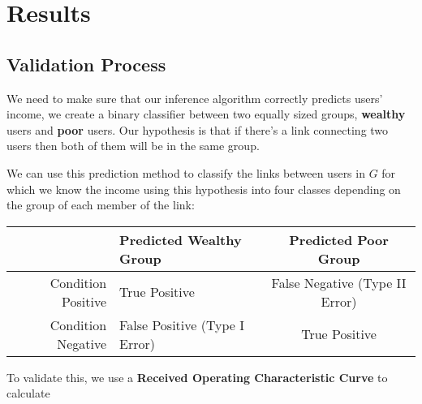 \section{Results}

\subsection{Validation Process}

We need to make sure that our inference algorithm correctly predicts users' income, we create a binary classifier between two equally sized groups, \textbf{wealthy} users and \textbf{poor} users. Our hypothesis is that if there's a link connecting two users then both of them will be in the same group.

We can use this prediction method to classify the links between users in $ G $ for which we know the income using this hypothesis into four classes depending on the group of each member of the link:

\begin{tabularx}{\textwidth}{|r|X|c|} \hline
& Predicted Wealthy Group & Predicted Poor Group \\ \hline
Condition Positive & True Positive & False Negative \newline (Type II Error) \\ \hline
Condition Negative & False Positive (Type I Error) & True Positive \\ \hline
\end{tabularx}

To validate this, we use a \textbf{Received Operating Characteristic Curve} to calculate 